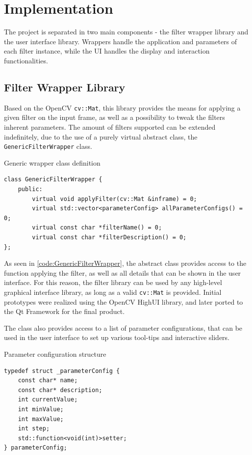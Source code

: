 \chapter{Implementation}

The project is separated in two main components - the filter wrapper library and the user interface library.
Wrappers handle the application and parameters of each filter instance, while the UI handles the display
and interaction functionalities.

\section{Filter Wrapper Library}

Based on the OpenCV \verb|cv::Mat|, this library provides the means for applying a given filter on the input
frame, as well as a possibility to tweak the filters inherent parameters. The amount of filters supported can
be extended indefinitely, due to the use of a purely virtual abstract class, the \verb|GenericFilterWrapper|
class.

\begin{code}
	\caption{Generic wrapper class definition}
	\label{code:GenericFilterWrapper}
	\begin{lstlisting}
class GenericFilterWrapper {
    public:
        virtual void applyFilter(cv::Mat &inframe) = 0;
        virtual std::vector<parameterConfig> allParameterConfigs() = 0;
        virtual const char *filterName() = 0;
        virtual const char *filterDescription() = 0;
};
    \end{lstlisting}
\end{code}

As seen in \cref{code:GenericFilterWrapper}, the abstract class provides access to the function
applying the filter, as well as all details that can be shown in the user interface. For this reason,
the filter library can be used by any high-level graphical interface library, as long as a valid
\verb|cv::Mat| is provided. Initial prototypes were realized using the OpenCV HighUI library, and later
ported to the Qt Framework for the final product.

The class also provides access to a list of parameter configurations, that can be used in the user
interface to set up various tool-tips and interactive sliders.

\begin{code}
	\caption{Parameter configuration structure}
	\label{code:parameterConfig}
	\begin{lstlisting}
typedef struct _parameterConfig {
    const char* name;
    const char* description;
    int currentValue;
    int minValue;
    int maxValue;
    int step;
    std::function<void(int)>setter;
} parameterConfig;
    \end{lstlisting}
\end{code}

